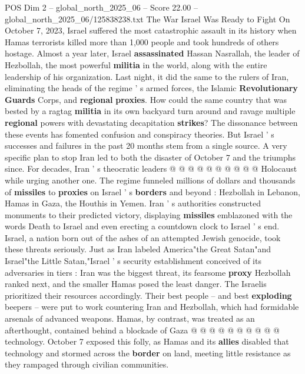 \begin{textsample}{POS Dim 2 – global\_north\_2025\_06 – Score 22.00 – global\_north\_2025\_06/125838238.txt}  \label{ex:f2_pos_358}
The War Israel Was Ready to Fight On October 7, 2023, Israel suffered the most catastrophic assault in its history when Hamas terrorists killed more than 1,000 people and took hundreds of others hostage.
Almost a year later, Israel \textbf{assassinated} Hassan Nasrallah, the leader of Hezbollah, the most powerful \textbf{militia} in the world, along with the entire leadership of his organization.
Last night, it did the same to the rulers of Iran, eliminating the heads of the regime ' s armed forces, the Islamic \textbf{Revolutionary} \textbf{Guards} Corps, and \textbf{regional} \textbf{proxies}.
How could the same country that was bested by a ragtag \textbf{militia} in its own backyard turn around and ravage multiple \textbf{regional} powers with devastating decapitation \textbf{strikes}?
The dissonance between these events has fomented confusion and conspiracy theories.
But Israel ' s successes and failures in the past 20 months stem from a single source.
A very specific plan to stop Iran led to both the disaster of October 7 and the triumphs since.
For decades, Iran ' s theocratic leaders @ @ @ @ @ @ @ @ @ @ Holocaust while urging another one.
The regime funneled millions of dollars and thousands of \textbf{missiles} to \textbf{proxies} on Israel ' s \textbf{borders} and beyond : Hezbollah in Lebanon, Hamas in Gaza, the Houthis in Yemen.
Iran ' s authorities constructed monuments to their predicted victory, displaying \textbf{missiles} emblazoned with the words Death to Israel and even erecting a countdown clock to Israel ' s end.
Israel, a nation born out of the ashes of an attempted Jewish genocide, took these threats seriously.
Just as Iran labeled America"the Great Satan"and Israel"the Little Satan,"Israel ' s security establishment conceived of its adversaries in tiers : Iran was the biggest threat, its fearsome \textbf{proxy} Hezbollah ranked next, and the smaller Hamas posed the least danger.
The Israelis prioritized their resources accordingly.
Their best people -- and best \textbf{exploding} beepers -- were put to work countering Iran and Hezbollah, which had formidable arsenals of advanced weapons.
Hamas, by contrast, was treated as an afterthought, contained behind a blockade of Gaza @ @ @ @ @ @ @ @ @ @ technology.
October 7 exposed this folly, as Hamas and its \textbf{allies} disabled that technology and stormed across the \textbf{border} on land, meeting little resistance as they rampaged through civilian communities.

\end{textsample}

